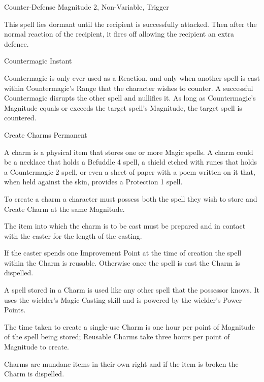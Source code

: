 \begin{rpg-spell}
{Counter-Defense}
{Magnitude 2, Non-Variable, Trigger}

This spell lies dormant until the recipient is successfully attacked. Then after the normal reaction of the recipient, it fires off allowing the recipient an extra defence.
\end{rpg-spell}



\begin{rpg-spell}
{Countermagic}
{Instant}

Countermagic is only ever used as a Reaction, and only when another spell is cast within Countermagic’s Range that the character wishes to counter. A successful Countermagic disrupts the other spell and nullifies it. As long as Countermagic’s Magnitude equals or exceeds the target spell’s Magnitude, the target spell is countered.
\end{rpg-spell}


\begin{rpg-spell}
{Create Charms}
{Permanent}

A charm is a physical item that stores one or more Magic spells. A charm could be a necklace that holds a Befuddle 4 spell, a shield etched with runes that holds a Countermagic 2 spell, or even a sheet of paper with a poem written on it that, when held against the skin, provides a Protection 1 spell.

\begin{rpg-list}
\item To create a charm a character must possess both the spell they wish to store and Create Charm at the same Magnitude.
\item The item into which the charm is to be cast must be prepared and in contact with the caster for the length of the casting.
\item If the caster spends one Improvement Point at the time of creation the spell within the Charm is reusable. Otherwise once the spell is cast the Charm is dispelled.
\item A spell stored in a Charm is used like any other spell that the possessor knows. It uses the wielder’s Magic Casting skill and is powered by the wielder’s Power Points.
\item The time taken to create a single-use Charm is one hour per point of Magnitude of the spell being stored; Reusable Charms take three hours per point of Magnitude to create.
\item Charms are mundane items in their own right and if the item is broken the Charm is dispelled.
\end{rpg-list}
\end{rpg-spell}



